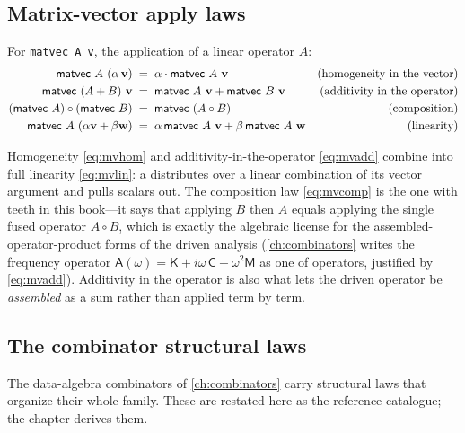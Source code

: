 \subsection{Matrix-vector apply laws}

\begin{lemma}
\label{lem:matvec}
For \lstinline[style=l4style]|matvec A v|, the application of a linear operator $A$:
\begin{align}
  \textsf{matvec}\ A\ (\alpha\,\vv)
    &\;=\; \alpha \cdot \textsf{matvec}\ A\ \vv
    & \text{(homogeneity in the vector)} \label{eq:mvhom}\\
  \textsf{matvec}\ (A + B)\ \vv
    &\;=\; \textsf{matvec}\ A\ \vv + \textsf{matvec}\ B\ \vv
    & \text{(additivity in the operator)} \label{eq:mvadd}\\
  (\textsf{matvec}\ A) \circ (\textsf{matvec}\ B)
    &\;=\; \textsf{matvec}\ (A \circ B)
    & \text{(composition)} \label{eq:mvcomp}\\
  \textsf{matvec}\ A\ (\alpha\vv + \beta\vw)
    &\;=\; \alpha\,\textsf{matvec}\ A\ \vv + \beta\,\textsf{matvec}\ A\ \vw
    & \text{(linearity)} \label{eq:mvlin}
\end{align}
\end{lemma}

\noindent Homogeneity \eqref{eq:mvhom} and additivity-in-the-operator \eqref{eq:mvadd}
combine into full linearity \eqref{eq:mvlin}: a  distributes over a
linear combination of its vector argument and pulls scalars out. The
composition law \eqref{eq:mvcomp} is the one with teeth in this book---it says that
applying $B$ then $A$ equals applying the single fused operator $A \circ B$, which is
exactly the algebraic license for the assembled-operator-product forms of the driven
analysis (\cref{ch:combinators} writes the frequency operator
$\mathsf{A}(\omega) = \mathsf{K} + i\omega\,\mathsf{C} - \omega^2\mathsf{M}$ as one
 of operators, justified by \eqref{eq:mvadd}). Additivity
in the operator is also what lets the driven operator be \emph{assembled} as a sum
rather than applied term by term.

\subsection{The combinator structural laws}

The data-algebra combinators of \cref{ch:combinators} carry structural laws that
organize their whole family. These are restated here as the reference catalogue; the
chapter derives them.

